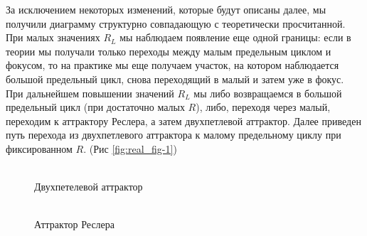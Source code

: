 \documentclass[12pt]{article}
\begin{document}
За исключением некоторых изменений, которые будут описаны далее, мы получили диаграмму структурно совпадающую с теоретически просчитанной.
При малых значениях $R_L$ мы наблюдаем появление еще одной границы: если в теории мы получали только переходы между малым предельным циклом и фокусом, то на практике мы еще получаем участок, на котором наблюдается большой предельный цикл, снова переходящий в малый и затем уже в фокус.
При дальнейшем повышении значений $R_L$ мы либо возвращаемся в большой предельный цикл (при достаточно малых $R$), либо, переходя через малый, переходим к аттрактору Реслера, а затем двухпетлевой аттрактор.
Далее приведен путь перехода из двухпетлевого аттрактора к малому предельному циклу при фиксированном $R$. (Рис \ref{fig:real_fig-1})
\begin{figure}[H]
	\begin{minipage}[h]{0.47\linewidth}
	  \\ Двухпетелевой аттрактор
	\end{minipage}
	\hfill
	\begin{minipage}[h]{0.47\linewidth}
	 \\ Аттрактор Реслера

\end{minipage}
\end{figure}
\end{document}
